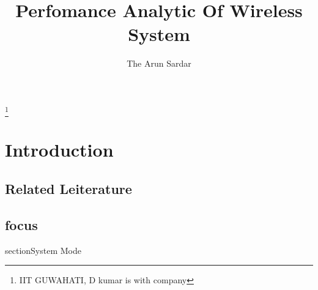 \documentclass[journal]{IEEEtran}
\begin{document}
	\title{Perfomance Analytic  Of Wireless System}
	\author{The Arun Sardar}
	\thanks{IIT GUWAHATI, D kumar is with company}
	\maketitle
	\begin{abstract}
		\blindtext
	\end{abstract}
\section{Introduction}
\blindtext
\subsection{Related Leiterature}
\blindtext
\subsection{focus}
\blindtext
section{System Mode}
\blindtext
\end{document}
